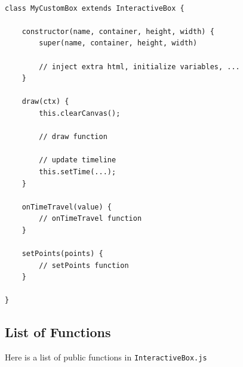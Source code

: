 \documentclass{article}
\begin{document}
\begin{lstlisting}[style=js]

class MyCustomBox extends InteractiveBox {

    constructor(name, container, height, width) {
        super(name, container, height, width)

        // inject extra html, initialize variables, ...
    }

    draw(ctx) {
        this.clearCanvas();

        // draw function

        // update timeline
        this.setTime(...);
    }

    onTimeTravel(value) {
        // onTimeTravel function
    }

    setPoints(points) {
        // setPoints function
    }

}
\end{lstlisting}

\pagebreak

\subsection{List of Functions}

Here is a list of public functions in \texttt{InteractiveBox.js}
\end{document}
